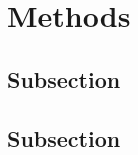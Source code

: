 \documentclass[../main.tex]{subfiles}
\begin{document}
\section{Methods}
    \label{section:methods}

\lipsum[1-3]

\textcite{lorem2020exploring}

\subsection{Subsection}
    \label{subsection:3.1}

\lipsum[1-3]

\textcite{dolor2021impact}

\subsection{Subsection}
    \label{subsection:3.2}

\lipsum[1-3]

\autocite{lorem2020exploring,elit2022adaptive}

    
\end{document}

